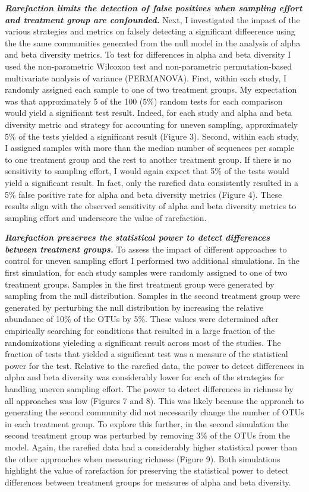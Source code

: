 \documentclass[
]{article}
\begin{document}
\textbf{\emph{Rarefaction limits the detection of false positives when
sampling effort and treatment group are confounded.}} Next, I
investigated the impact of the various strategies and metrics on falsely
detecting a significant diffeerence using the the same communities
generated from the null model in the analysis of alpha and beta
diversity metrics. To test for differences in alpha and beta diversity I
used the non-parametric Wilcoxon test and non-parametric
permutation-based multivariate analysis of variance (PERMANOVA). First,
within each study, I randomly assigned each sample to one of two
treatment groups. My expectation was that approximately 5 of the 100
(5\%) random tests for each comparison would yield a significant test
result. Indeed, for each study and alpha and beta diversity metric and
strategy for accounting for uneven sampling, approximately 5\% of the
tests yielded a significant result (Figure 3). Second, within each
study, I assigned samples with more than the median number of sequences
per sample to one treatment group and the rest to another treatment
group. If there is no sensitivity to sampling effort, I would again
expect that 5\% of the tests would yield a significant result. In fact,
only the rarefied data consistently resulted in a 5\% false positive
rate for alpha and beta diversity metrics (Figure 4). These results
align with the observed sensitivity of alpha and beta diversity metrics
to sampling effort and underscore the value of rarefaction.

\textbf{\emph{Rarefaction preserves the statistical power to detect
differences between treatment groups.}} To assess the impact of
different approaches to control for uneven sampling effort I performed
two additional simulations. In the first simulation, for each study
samples were randomly assigned to one of two treatment groups. Samples
in the first treatment group were generated by sampling from the null
distribution. Samples in the second treatment group were generated by
perturbing the null distribution by increasing the relative abundance of
10\% of the OTUs by 5\%. These values were determined after empirically
searching for conditions that resulted in a large fraction of the
randomizations yieleding a significant result across most of the
studies. The fraction of tests that yielded a significant test was a
measure of the statistical power for the test. Relative to the rarefied
data, the power to detect differences in alpha and beta diversity was
considerably lower for each of the strategies for handling uneven
sampling effort. The power to detect differences in richness by all
approaches was low (Figures 7 and 8). This was likely because the
approach to generating the second community did not necessarily change
the number of OTUs in each treatment group. To explore this further, in
the second simulation the second treatment group was perturbed by
removing 3\% of the OTUs from the model. Again, the rarefied data had a
considerably higher statistical power than the other approaches when
measuring richness (Figure 9). Both simulations highlight the value of
rarefaction for preserving the statistical power to detect differences
between treatment groups for measures of alpha and beta diversity.
\end{document}
